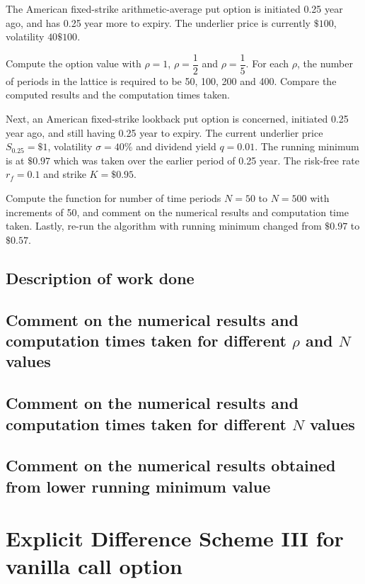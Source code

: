 The American fixed-strike arithmetic-average put option is initiated 0.25 year ago, and has 0.25 year more to expiry. The underlier price is currently $\$100$, volatility $40%
\$100$.

Compute the option value with $\rho=1$, $\rho=\dfrac{1}{2}$ and $\rho = \dfrac{1}{5}$. For each $\rho$, the number of periods in the lattice is required to be 50, 100, 200 and 400. Compare the computed results and the computation times taken.

Next, an American fixed-strike lookback put option is concerned, initiated 0.25 year ago, and still having 0.25 year to expiry. The current underlier price $S_{0.25}=\$1$, volatility $\sigma=40\%$ and dividend yield $q = 0.01$. The running minimum is at $\$0.97$ which was taken over the earlier period of 0.25 year. The risk-free rate $r_f=0.1$ and strike $K=\$0.95$.

Compute the function for number of time periods $N = 50$ to $N = 500$ with increments of 50, and comment on the numerical results and computation time taken. Lastly, re-run the algorithm with running minimum changed from $\$0.97$ to $\$0.57$.

\subsection{Description of work done}

\subsection{Comment on the numerical results and computation times taken for different $\rho$ and $N$ values}

\subsection{Comment on the numerical results and computation times taken for different $N$ values}

\subsection{Comment on the numerical results obtained from lower running minimum value}

\section{Explicit Difference Scheme III for vanilla call option}
